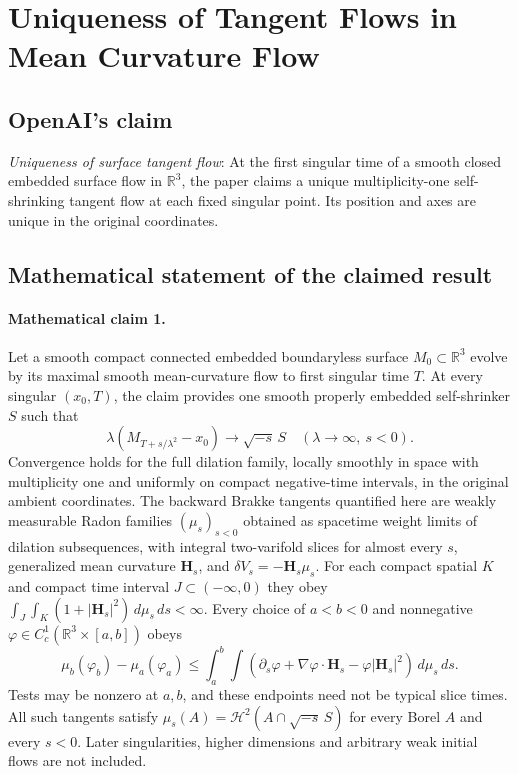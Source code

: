 \documentclass[11pt]{article}
\begin{document}
\section*{Uniqueness of Tangent Flows in Mean Curvature Flow}

\subsection{OpenAI's claim}
\textit{Uniqueness of surface tangent flow}: At the first singular time of a smooth closed embedded surface flow in $\mathbb R^3$, the paper claims a unique multiplicity-one self-shrinking tangent flow at each fixed singular point. Its position and axes are unique in the original coordinates.

\subsection{Mathematical statement of the claimed result}
\paragraph{Mathematical claim 1.} Let a smooth compact connected embedded boundaryless surface $M_0\subset\mathbb R^3$ evolve by its maximal smooth mean-curvature flow to first singular time $T$. At every singular $(x_0,T)$, the claim provides one smooth properly embedded self-shrinker $S$ such that \[\lambda(M_{T+s/\lambda^2}-x_0)\longrightarrow\sqrt{-s}\,S\quad(\lambda\to\infty,\ s<0).\] Convergence holds for the full dilation family, locally smoothly in space with multiplicity one and uniformly on compact negative-time intervals, in the original ambient coordinates. The backward Brakke tangents quantified here are weakly measurable Radon families $(\mu_s)_{s<0}$ obtained as spacetime weight limits of dilation subsequences, with integral two-varifold slices for almost every $s$, generalized mean curvature $\mathbf H_s$, and $\delta V_s=-\mathbf H_s\mu_s$. For each compact spatial $K$ and compact time interval $J\subset(-\infty,0)$ they obey $\int_J\int_K(1+|\mathbf H_s|^2)\,d\mu_s\,ds<\infty$. Every choice of $a<b<0$ and nonnegative $\varphi\in C_c^1(\mathbb R^3\times[a,b])$ obeys \[\mu_b(\varphi_b)-\mu_a(\varphi_a)\le\int_a^b\int(\partial_s\varphi+\nabla\varphi\cdot\mathbf H_s-\varphi|\mathbf H_s|^2)\,d\mu_s\,ds.\] Tests may be nonzero at $a,b$, and these endpoints need not be typical slice times. All such tangents satisfy $\mu_s(A)=\mathcal H^2(A\cap\sqrt{-s}\,S)$ for every Borel $A$ and every $s<0$. Later singularities, higher dimensions and arbitrary weak initial flows are not included.
\end{document}
